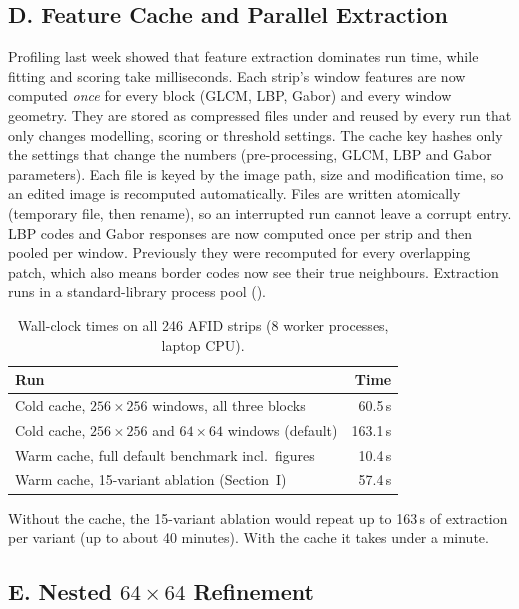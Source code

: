 \documentclass[11pt,a4paper]{article}
\newcommand{\code}[1]{\texttt{\detokenize{#1}}}
\begin{document}
\subsection*{D. Feature Cache and Parallel Extraction}

Profiling last week showed that feature extraction dominates run time, while fitting and scoring take milliseconds. Each strip's window features are now computed \emph{once} for every block (GLCM, LBP, Gabor) and every window geometry. They are stored as compressed \code{.npz} files under \code{data/processed/} and reused by every run that only changes modelling, scoring or threshold settings. The cache key hashes only the settings that change the numbers (pre-processing, GLCM, LBP and Gabor parameters). Each file is keyed by the image path, size and modification time, so an edited image is recomputed automatically. Files are written atomically (temporary file, then rename), so an interrupted run cannot leave a corrupt entry. LBP codes and Gabor responses are now computed once per strip and then pooled per window. Previously they were recomputed for every overlapping patch, which also means border codes now see their true neighbours. Extraction runs in a standard-library process pool (\code{--workers}).

\begin{table}[h]
\centering
\caption{Wall-clock times on all 246 AFID strips (8 worker processes, laptop CPU).}
\label{tab:time}
\small
\begin{tabular}{@{}lr@{}}
\toprule
\textbf{Run} & \textbf{Time} \\
\midrule
Cold cache, $256\times256$ windows, all three blocks & 60.5\,s \\
Cold cache, $256\times256$ and $64\times64$ windows (default) & 163.1\,s \\
Warm cache, full default benchmark incl.\ figures & 10.4\,s \\
Warm cache, 15-variant ablation (Section~I) & 57.4\,s \\
\bottomrule
\end{tabular}
\end{table}

Without the cache, the 15-variant ablation would repeat up to 163\,s of extraction per variant (up to about 40 minutes). With the cache it takes under a minute.

\subsection*{E. Nested $64\times64$ Refinement}
\end{document}
